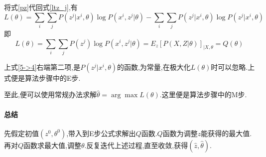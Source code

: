 \documentclass{ctexrep}
\begin{document}
将式\ref{pz}代回式\ref{ltz_j},有
\begin{equation}
	L(\theta)
	=\sum\limits_i\sum\limits_j P(z^j|x^i,\theta)\log P(x^i,z^j|\theta)-\sum\limits_i\sum\limits_j P(z^j|x^i,\theta)\log P(z^j|x^i,\theta)
\label{5->4}
\end{equation}
即$$L(\theta)=\sum\limits_i\sum\limits_j P(z^j)\log P(x^i,z^j|\theta)=E_z[P(X,Z|\theta)]_{|
X,\theta}=Q(\theta)$$

上式\ref{5->4}右端第二项,是$P(z^j|x^i,\theta)$的函数,为常量,在极大化$L(\theta)$时可以忽略.上式便是算法步骤中的E步.

至此,便可以使用常规办法求解$\hat{\theta}=\arg\max{L(\theta)}$.这里便是算法步骤中的M步.

\paragraph{总结}
先假定初值$(z^0,\theta^0)$,带入到E步公式求解出$Q$函数.$Q$函数为调整$z$能获得的最大值.再对$Q$函数求最大值,调整$\theta$.反复迭代上述过程,直至收敛,获得$(\hat{z},\hat{\theta})$.












\end{document}
